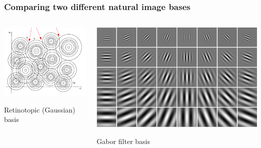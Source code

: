 \documentclass{beamer}
\begin{document}
\begin{frame}
\frametitle{Comparing two different natural image bases}
\begin{columns}
\begin{column}{0.5\textwidth}
\includegraphics[scale = 0.2]{rbf.png}

Retinotopic (Gaussian) basis
\end{column}
\begin{column}{0.5\textwidth}
\includegraphics[scale = 0.2]{../info_theory_paper/thesis_2/Figures/Gabor.jpg}

Gabor filter basis
\end{column}
\end{columns}
\end{frame}
\end{document}
